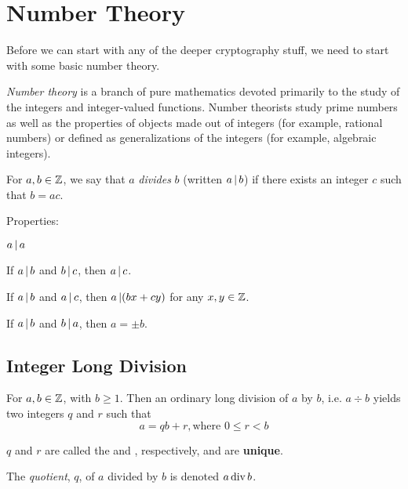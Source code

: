 \section{Number Theory}\label{sec:Number_Theory}
Before we can start with any of the deeper cryptography stuff, we need to start with some basic number theory.
\begin{definition}\label{def:Number_Theory}
  \emph{Number theory} is a branch of pure mathematics devoted primarily to the study of the integers and integer-valued functions.
  Number theorists study prime numbers as well as the properties of objects made out of integers (for example, rational numbers) or defined as generalizations of the integers (for example, algebraic integers).
\end{definition}

\begin{definition}[Divides]\label{def:Divides}
  For $a, b \in \operatorname{\mathbb{Z}}$, we say that $a$ \emph{divides} $b$ (written $a \operatorname{\vert} b$) if there exists an integer $c$ such that $b = ac$.

  Properties:
  \begin{propertylist}
  \item $a \operatorname{\vert} a$
  \item If $a \operatorname{\vert} b$ and $b \operatorname{\vert} c$, then $a \operatorname{\vert} c$.
  \item If $a \operatorname{\vert} b$ and $a \operatorname{\vert} c$, then $a \operatorname{\vert} (bx + cy)$ for any $x, y \in \operatorname{\mathbb{Z}}$.
  \item If $a \operatorname{\vert} b$ and $b \operatorname{\vert} a$, then $a = \pm b$.
  \end{propertylist}
\end{definition}

\subsection{Integer Long Division}\label{subsec:Integer_Long_Division}
For $a, b \in \operatorname{\mathbb{Z}}$, with $b \geq 1$.
Then an ordinary long division of $a$ by $b$, i.e. $a \div b$ yields two integers $q$ and $r$ such that
\begin{equation}\label{eq:Integer_Long_Division}
  a = qb + r, \text{where } 0 \leq r < b
\end{equation}

$q$ and $r$ are called the  and , respectively, and are \textbf{unique}.

\begin{definition}[Quotient]\label{def:Integer_Quotient}
  The \emph{quotient}, $q$, of $a$ divided by $b$ is denoted $a \operatorname{\text{div}} b$.
\end{definition}

